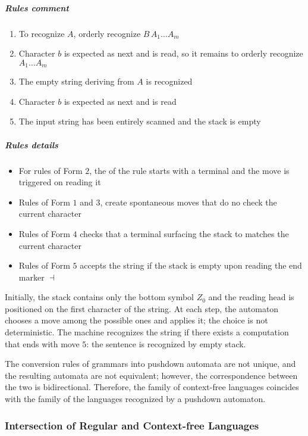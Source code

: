 \documentclass[english]{article}
\begin{document}
\subparagraph*{Rules comment}

\begin{enumerate}[label=\#\arabic*., labelindent=1em, leftmargin=*, widest*=2]
  \item To recognize \(A\), orderly recognize \(B \, A_1 \ldots A_m\)
  \item Character \(b\) is expected as next and is read, so it remains to orderly recognize \(A_1 \ldots A_m\)
  \item The empty string deriving from \(A\) is recognized
  \item Character \(b\) is expected as next and is read
  \item The input string has been entirely scanned and the stack is empty
\end{enumerate}

\subparagraph*{Rules details}

\begin{itemize}
  \item For rules of Form \(2\), the \RP of the rule starts with a terminal and the move is triggered on reading it
  \item Rules of Form \(1\) and \(3\), create spontaneous moves that do no check the current character
  \item Rules of Form \(4\) checks that a terminal surfacing the stack to matches the current character
  \item Rules of Form \(5\) accepts the string if the stack is empty upon reading the end marker \(\dashv\)
\end{itemize}

Initially, the stack contains only the bottom symbol \(Z_0\) and the reading head is positioned on the first character of the string.
At each step, the automaton chooses a move among the possible ones and applies it; the choice is not deterministic.
The machine recognizes the string if there exists a computation that ends with move \(5\): the sentence is recognized by empty stack.

The conversion rules of grammars into pushdown automata are not unique, and the resulting automata are not equivalent;
however, the correspondence between the two is bidirectional.
Therefore, the family of context-free languages \CF coincides with the family of the languages recognized by a pushdown automaton.

\subsubsection{Intersection of Regular and Context-free Languages}
\label{sec:intersection-of-regular-and-context-free-languages}
\end{document}

